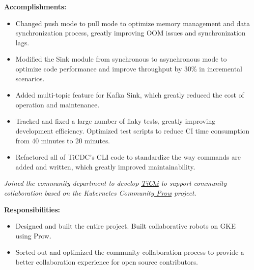 \documentclass{resume}
\newcommand{\en}[1]{#1}
\newcommand{\zh}[1]{}
\begin{document}
\en{\textbf{Accomplishments:}}
\zh{\textbf{产出：}}
\begin{itemize}
      \item \en{Changed push mode to pull mode to optimize memory management and data synchronization process, greatly improving OOM issues and synchronization lags.}
            \zh{将推送模式修改为了拉取模式优化了内存管理和数据同步流程，极大的改善了 OOM 问题和同步延迟。}
      \item \en{Modified the Sink module from synchronous to asynchronous mode to optimize code performance and improve throughput by 30\% in incremental scenarios.}
            \zh{将 Sink 模块从同步模式修改为异步模式，优化代码性能，将增量场景下吞吐提升 30\%。}
      \item \en{ Added multi-topic feature for Kafka Sink, which greatly reduced the cost of operation and maintenance.}
            \zh{为 Kafka Sink 支持了多 Topic 功能，极大的降低了多 Topic 的任务运维成本。}
      \item \en{Tracked and fixed a large number of flaky tests, greatly improving development efficiency. Optimized test scripts to reduce CI time consumption from 40 minutes to 20 minutes.}
            \zh{追踪和修复大量不稳定测试，极大的提升了开发效率。优化了测试脚本，将 CI 时间消耗从 40 分钟降低至 20 分钟。}
      \item \en{Refactored all of TiCDC’s CLI code to standardize the way commands are added and written, which greatly improved maintainability.}
            \zh{重构了 TiCDC 的 CLI 所有代码，标准化了命令添加和编写方式，极大提升了可维护性。}
\end{itemize}
\en{}
\zh{\datedsubsection{\textbf{\href{https://pingcap.com/zh/}{PingCAP Inc. - 数据库 - 前后端开发工程师}}}{2020/08 -- 2021/07}}
\en{\textsl{Joined the community department to develop {\href{https://github.com/ti-community-infra/tichi}{TiChi}} to support community collaboration based on the Kubernetes Community{\href{https://github.com/kubernetes/test-infra/tree/master/prow}{ Prow}} project.}}
\zh{\textsl{加入了社区部门，以 Kubernetes 社区{\href{https://github.com/kubernetes/test-infra/tree/master/prow}{ Prow}} 项目为基础开发{\href{https://github.com/ti-community-infra/tichi}{ TiChi}} 来支撑社区协作。}}

\en{\textbf{Responsibilities:}}
\zh{\textbf{职责：}}
\begin{itemize}
      \item \en{Designed and built the entire project. Built collaborative robots on GKE using Prow.}
            \zh{从零开始设计和构建整个项目，使用 Prow 在 GKE 上搭建协作机器人。}
      \item \en{Sorted out and optimized the community collaboration process to provide a better collaboration experience for open source contributors.}
            \zh{负责社区协作流程的梳理和优化，为开源贡献者提供更好的协作体验。}
\end{itemize}
\end{document}
